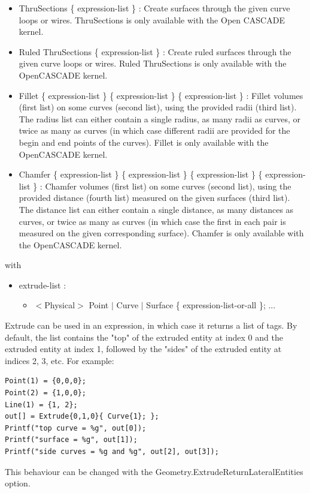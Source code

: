 \documentclass[dvipdfmx, 9pt, a4paper]{article}
\numberwithin{equation}{section}
\begin{document}
\begin{itemize}
\begin{itemize}
\item ThruSections \{ expression-list \} : Create surfaces through the given curve loops or wires. ThruSections is only available with the Open CASCADE kernel.
\item Ruled ThruSections \{ expression-list \} : Create ruled surfaces through the given curve loops or wires. Ruled ThruSections
is only available with the OpenCASCADE kernel.
\item Fillet \{ expression-list \} \{ expression-list \} \{ expression-list \} : Fillet volumes (first list) on some curves (second list), using the provided radii (third list). The radius list can either contain a single radius, as many radii as curves, or twice as many as curves (in which case different radii are provided for the begin and end points of the curves). Fillet is only available with the OpenCASCADE kernel.
\item Chamfer \{ expression-list \} \{ expression-list \} \{ expression-list \} \{ expression-list \} : Chamfer volumes (first list) on some curves (second list), using the provided distance (fourth list) measured on the given surfaces (third list). The distance list can either contain a single distance, as many distances as curves, or twice as many as curves (in which case the first in each pair is measured on the given corresponding surface). Chamfer is only available with the OpenCASCADE kernel.
\end{itemize}
\end{itemize}
with
\begin{itemize}
\item extrude-list : 
\begin{itemize}
\item $<$Physical$>$ Point $|$ Curve $|$ Surface \{ expression-list-or-all \}; ...
\end{itemize}
\end{itemize}
Extrude can be used in an expression, in which case it returns a list of tags. By default, the list contains the "top" of the extruded entity at index 0 and the extruded entity at index 1, followed by the "sides" of the extruded entity at indices 2, 3, etc. For example:
\begin{lstlisting}
Point(1) = {0,0,0};
Point(2) = {1,0,0};
Line(1) = {1, 2};
out[] = Extrude{0,1,0}{ Curve{1}; };
Printf("top curve = %g", out[0]);
Printf("surface = %g", out[1]);
Printf("side curves = %g and %g", out[2], out[3]);
\end{lstlisting}
This behaviour can be changed with the Geometry.ExtrudeReturnLateralEntities option.
\end{document}
